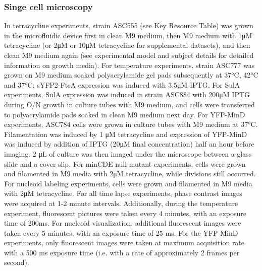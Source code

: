 \subsubsection{Singe cell microscopy}
In tetracycline experiments, strain ASC555 (see Key Resource Table) was grown in the microfluidic device first in clean M9 medium, then M9 medium with 1μM tetracycline (or 2μM or 10μM tetracycline for supplemental datasets), and then clean M9 medium again (see experimental model and subject details for detailed information on growth media). For temperature experiments, strain ASC777 was grown on M9 medium soaked polyacrylamide gel pads subsequently at 37°C, 42°C and 37°C; sYFP2-FtsA expression was induced with 3.5μM IPTG. For SulA experiments, SulA expression was induced in strain ASC884 with 200μM IPTG during O/N growth in culture tubes with M9 medium, and cells were transferred to polyacrylamide pads soaked in clean M9 medium next day. For YFP-MinD experiments, ASC784 cells were grown in culture tubes with M9 medium at 37°C. Filamentation was induced by 1 μM tetracycline and expression of YFP-MinD was induced by addition of IPTG (20μM final concentration) half an hour before imaging. 2 μL of culture was then imaged under the microscope between a glass slide and a cover slip. For minCDE null mutant experiments, cells were grown and filamented in M9 media with 2μM tetracycline, while divisions still occurred. For nucleoid labeling experiments, cells were grown and filamented in M9 media with 2μM tetracycline. For all time lapse experiments, phase contrast images were acquired at 1-2 minute intervals. Additionally, during the temperature experiment, fluorescent pictures were taken every 4 minutes, with an exposure time of 200ms. For nucleoid visualization, additional fluorescent images were taken every 5 minutes, with an exposure time of 25 ms. For the YFP-MinD experiments, only fluorescent images were taken at maximum acquisition rate with a 500 ms exposure time (i.e. with a rate of approximately 2 frames per second).

